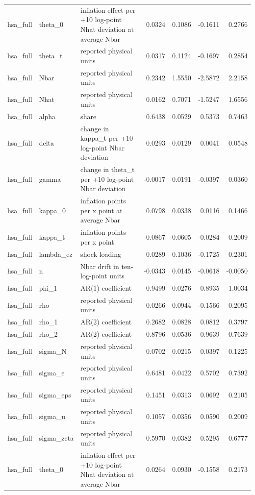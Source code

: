 \begin{tabular}{lllrrrr}
hsa\_full & theta\_0 & inflation effect per +10 log-point Nhat deviation at average Nbar & 0.0324 & 0.1086 & -0.1611 & 0.2766 \\
hsa\_full & theta\_t & reported physical units & 0.0317 & 0.1124 & -0.1697 & 0.2854 \\
hsa\_full & Nbar & reported physical units & 0.2342 & 1.5550 & -2.5872 & 2.2158 \\
hsa\_full & Nhat & reported physical units & 0.0162 & 0.7071 & -1.5247 & 1.6556 \\
hsa\_full & alpha & share & 0.6438 & 0.0529 & 0.5373 & 0.7463 \\
hsa\_full & delta & change in kappa\_t per +10 log-point Nbar deviation & 0.0293 & 0.0129 & 0.0041 & 0.0548 \\
hsa\_full & gamma & change in theta\_t per +10 log-point Nbar deviation & -0.0017 & 0.0191 & -0.0397 & 0.0360 \\
hsa\_full & kappa\_0 & inflation points per x point at average Nbar & 0.0798 & 0.0338 & 0.0116 & 0.1466 \\
hsa\_full & kappa\_t & inflation points per x point & 0.0867 & 0.0605 & -0.0284 & 0.2009 \\
hsa\_full & lambda\_ez & shock loading & 0.0289 & 0.1036 & -0.1725 & 0.2301 \\
hsa\_full & n & Nbar drift in ten-log-point units & -0.0343 & 0.0145 & -0.0618 & -0.0050 \\
hsa\_full & phi\_1 & AR(1) coefficient & 0.9499 & 0.0276 & 0.8935 & 1.0034 \\
hsa\_full & rho & reported physical units & 0.0266 & 0.0944 & -0.1566 & 0.2095 \\
hsa\_full & rho\_1 & AR(2) coefficient & 0.2682 & 0.0828 & 0.0812 & 0.3797 \\
hsa\_full & rho\_2 & AR(2) coefficient & -0.8796 & 0.0536 & -0.9639 & -0.7639 \\
hsa\_full & sigma\_N & reported physical units & 0.0702 & 0.0215 & 0.0397 & 0.1225 \\
hsa\_full & sigma\_e & reported physical units & 0.6481 & 0.0422 & 0.5702 & 0.7392 \\
hsa\_full & sigma\_eps & reported physical units & 0.1451 & 0.0313 & 0.0692 & 0.2105 \\
hsa\_full & sigma\_u & reported physical units & 0.1057 & 0.0356 & 0.0590 & 0.2009 \\
hsa\_full & sigma\_zeta & reported physical units & 0.5970 & 0.0382 & 0.5295 & 0.6777 \\
hsa\_full & theta\_0 & inflation effect per +10 log-point Nhat deviation at average Nbar & 0.0264 & 0.0930 & -0.1558 & 0.2173 \\

\end{tabular}
